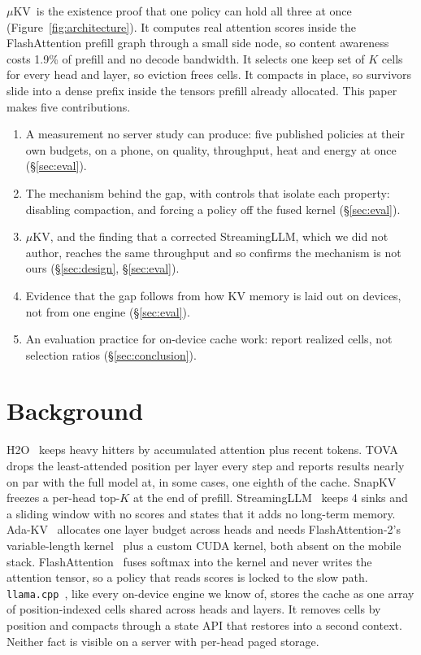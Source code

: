 \documentclass[sigconf, anonymous=false, screen=true, 10pt]{acmart}
\newcommand{\muKV}{$\mu$KV}
\begin{document}
\muKV\ is the existence proof that one policy can hold all three at once (Figure~\ref{fig:architecture}). It computes real attention scores inside the FlashAttention prefill graph through a small side node, so content awareness costs 1.9\% of prefill and no decode bandwidth. It selects one keep set of $K$ cells for every head and layer, so eviction frees cells. It compacts in place, so survivors slide into a dense prefix inside the tensors prefill already allocated. This paper makes five contributions.

\begin{enumerate}[label=(\roman*), leftmargin=*, itemsep=1pt]
\item A measurement no server study can produce: five published policies at their own budgets, on a phone, on quality, throughput, heat and energy at once (\S\ref{sec:eval}).
\item The mechanism behind the gap, with controls that isolate each property: disabling compaction, and forcing a policy off the fused kernel (\S\ref{sec:eval}).
\item \muKV, and the finding that a corrected StreamingLLM, which we did not author, reaches the same throughput and so confirms the mechanism is not ours (\S\ref{sec:design}, \S\ref{sec:eval}).
\item Evidence that the gap follows from how KV memory is laid out on devices, not from one engine (\S\ref{sec:eval}).
\item An evaluation practice for on-device cache work: report realized cells, not selection ratios (\S\ref{sec:conclusion}).
\end{enumerate}

\section{Background}
\label{sec:bg}

H2O~\cite{zhang2023h2o} keeps heavy hitters by accumulated attention plus recent tokens. TOVA~\cite{oren2024tova} drops the least-attended position per layer every step and reports results nearly on par with the full model at, in some cases, one eighth of the cache. SnapKV~\cite{li2024snapkv} freezes a per-head top-$K$ at the end of prefill. StreamingLLM~\cite{xiao2024streamingllm} keeps 4 sinks and a sliding window with no scores and states that it adds no long-term memory. Ada-KV~\cite{feng2025adakv} allocates one layer budget across heads and needs FlashAttention-2's variable-length kernel~\cite{dao2023flashattention2} plus a custom CUDA kernel, both absent on the mobile stack. FlashAttention~\cite{dao2022flashattention} fuses softmax into the kernel and never writes the attention tensor, so a policy that reads scores is locked to the slow path. \texttt{llama.cpp}~\cite{llamacpp}, like every on-device engine we know of, stores the cache as one array of position-indexed cells shared across heads and layers. It removes cells by position and compacts through a state API that restores into a second context. Neither fact is visible on a server with per-head paged storage.
\end{document}
